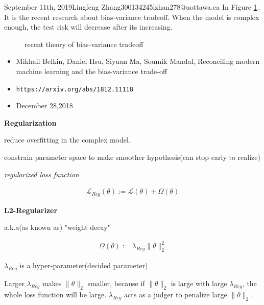 \documentclass{article}
\begin{document}
\begin{lecture}{September 11th, 2019}{Lingfeng Zhang}{300134245}{lzhan278@uottawa.ca}
In Figure \ref{fig:modernTheory}. It is the recent research about bias-variance tradeoff. When the model is complex enough, the test risk will decrease after its increasing.

\begin{figure}[ht!]
\centering
{}
\caption{recent theory of bias-variance tradeoff}
\label{fig:modernTheory}
\end{figure}

\begin{itemize}
\item Mikhail Belkin, Daniel Hsu, Siyuan Ma, Soumik Mandal,
Reconciling modern machine learning and the bias-variance trade-off
\item \texttt{https://arxiv.org/abs/1812.11118}
\item December 28,2018
\end{itemize}


\textbf{Regularization}

reduce overfitting in the complex model.

constrain parameter space to make smoother hypothesis(can stop early to realize)

\emph{regularized loss function}

\begin{eqnarray}
\mathcal{L}_{Reg}(\theta) := \mathcal{L}(\theta) + \Omega(\theta)
\end{eqnarray}

\textbf{L2-Regularizer}

a.k.a(as known as) "weight decay"

\begin{eqnarray}
\Omega(\theta) := \lambda_{Reg}\| \theta \| _2 ^2
\end{eqnarray}

$ \lambda_{Reg}$ is a hyper-parameter(decided parameter)

Larger $ \lambda_{Reg}$ makes $\| \theta \| _2$ smaller, because if $\| \theta \| _2$ is large with large $ \lambda_{Reg}$, the whole loss function will be large. $ \lambda_{Reg}$ acts as a judger to penalize large $\| \theta \| _2$.


\end{lecture}
\end{document}
